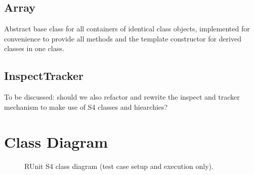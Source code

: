 \documentclass[a4paper,10pt]{article}
\begin{document}
\subsection{Array}
Abstract base class for all containers of identical class objects,
implemented for convenience to provide all methods and the template
constructor for derived classes in one class.

\subsection{InspectTracker}
To be discussed: should we also refactor and rewrite the inspect and
tracker mechanism to make use of S4 classes and hiearchies?
\clearpage

\section{Class Diagram}
\begin{center}
\begin{figure}[htb]
\caption{RUnit S4 class diagram (test case setup and execution only).}
\end{figure}
\end{center}
\end{document}
